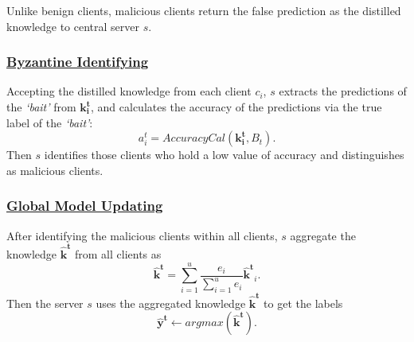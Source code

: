 \documentclass[journal]{IEEEtran}
\begin{document}
  Unlike benign clients, malicious clients return the false prediction as the distilled knowledge to central server $s$.
  \subsubsection{\ul{Byzantine Identifying}} Accepting the distilled knowledge from each client $c_i$, $s$ extracts the predictions of the \textit{`bait'} from $\mathbf{k_i^t}$, and calculates the accuracy of the predictions via the true label of the \textit{`bait'}:
  \begin{equation}
    a_i^t=AccuracyCal(\mathbf{k_i^t}, B_t).
  \end{equation}
  Then $s$ identifies those clients who hold a low value of accuracy and distinguishes as malicious clients.
  \subsubsection{\ul{Global Model Updating}} After identifying the malicious clients within all clients, $s$ aggregate the knowledge $\mathbf{\hat{k}^t}$ from all clients as
  \begin{equation}
    \mathbf{\hat{k}^t}=\sum_{i=1}^{u}\frac{e_i}{\sum_{i=1}^{u}e_i}\mathbf{\hat{k}^t}_i.
  \end{equation}
  Then the server $s$ uses the aggregated knowledge $\mathbf{\hat{k}^t}$ to get the labels
  \begin{equation}
    \mathbf{\hat{y}^t}\gets argmax(\mathbf{\hat{k}^t}).
  \end{equation} 


  
\end{document}
